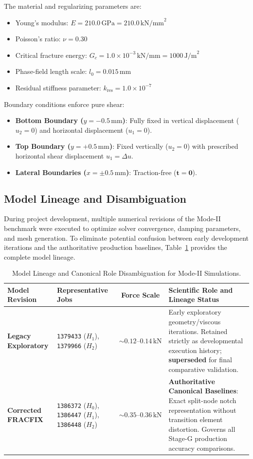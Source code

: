 The material and regularizing parameters are:
\begin{itemize}
    \item Young's modulus: $E = 210.0\,\text{GPa} = 210.0\,\text{kN/mm}^2$
    \item Poisson's ratio: $\nu = 0.30$
    \item Critical fracture energy: $G_c = 1.0\times 10^{-3}\,\text{kN/mm} = 1000\,\text{J/m}^2$
    \item Phase-field length scale: $l_0 = 0.015\,\text{mm}$
    \item Residual stiffness parameter: $k_{\mathrm{res}} = 1.0\times 10^{-7}$
\end{itemize}

Boundary conditions enforce pure shear:
\begin{itemize}
    \item \textbf{Bottom Boundary ($y = -0.5\,\text{mm}$)}: Fully fixed in vertical displacement ($u_2 = 0$) and horizontal displacement ($u_1 = 0$).
    \item \textbf{Top Boundary ($y = +0.5\,\text{mm}$)}: Fixed vertically ($u_2 = 0$) with prescribed horizontal shear displacement $u_1 = \Delta u$.
    \item \textbf{Lateral Boundaries ($x = \pm 0.5\,\text{mm}$)}: Traction-free ($\mathbf{t} = \mathbf{0}$).
\end{itemize}

\subsection{Model Lineage and Disambiguation}
During project development, multiple numerical revisions of the Mode-II benchmark were executed to optimize solver convergence, damping parameters, and mesh generation. To eliminate potential confusion between early development iterations and the authoritative production baselines, Table~\ref{tab:mode_ii_model_lineage} provides the complete model lineage.

\begin{table}[htbp]
\centering
\small
\caption{Model Lineage and Canonical Role Disambiguation for Mode-II Simulations.}
\label{tab:mode_ii_model_lineage}
\begin{tabular}{lp{3.5cm}cp{5.5cm}}
\toprule
\textbf{Model Revision} & \textbf{Representative Jobs} & \textbf{Force Scale} & \textbf{Scientific Role and Lineage Status} \\
\midrule
\textbf{Legacy Exploratory} & \texttt{1379433} ($H_1$), \texttt{1379966} ($H_2$) & $\sim 0.12\text{--}0.14\,\text{kN}$ & Early exploratory geometry/viscous iterations. Retained strictly as developmental execution history; \textbf{superseded} for final comparative validation. \\
\midrule
\textbf{Corrected FRACFIX} & \texttt{1386372} ($H_0$), \texttt{1386447} ($H_1$), \texttt{1386448} ($H_2$) & $\sim 0.35\text{--}0.36\,\text{kN}$ & \textbf{Authoritative Canonical Baselines}: Exact split-node notch representation without transition element distortion. Governs all Stage-G production accuracy comparisons. \\
\bottomrule
\end{tabular}
\end{table}

